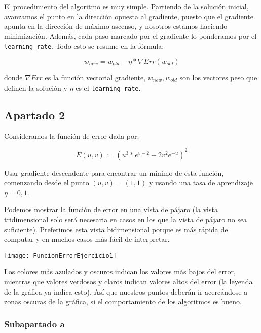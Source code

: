 \documentclass[11pt]{article}
\begin{document}
El procedimiento del algoritmo es muy simple. Partiendo de la solución inicial, avanzamos el punto en la dirección opuesta al gradiente, puesto que el gradiente apunta en la dirección de máximo ascenso, y nosotros estamos haciendo minimización. Además, cada paso marcado por el gradiente lo ponderamos por el \lstinline{learning_rate}. Todo esto se resume en la fórmula:

\begin{displaymath}
    w_{new} = w_{old} - \eta * \nabla Err(w_{old})
\end{displaymath}

donde $\nabla Err$ es la función vectorial gradiente, $w_{new}, w_{old}$ son los vectores peso que definen la solución y $\eta$ es el \lstinline{learning_rate}.

\pagebreak

\subsection{Apartado 2}
\label{seccion:Apartado2}

Consideramos la función de error dada por:

\begin{displaymath}
    E(u, v) := (u^3 * e^{v-2} - 2v^2 e^{-u})^2
\end{displaymath}

Usar gradiente descendente para encontrar un mínimo de esta función, comenzando desde el punto $(u, v) = (1, 1)$ y
usando una tasa de aprendizaje $\eta = 0,1$.

Podemos mostrar la función de error en una vista de pájaro (la vista tridimensional solo será necesaria en casos en los que la vista de pájaro no sea suficiente). Preferimos esta vista bidimensional porque es más rápida de computar y en muchos casos más fácil de interpretar.

\texttt{[image: FuncionErrorEjercicio1]}

Los colores más azulados y oscuros indican los valores más bajos del error, mientras que valores verdosos y claros indican valores altos del error (la leyenda de la gráfica ya indica esto). Así que nuestros puntos deberán ir acercándose a zonas oscuras de la gráfica, si el comportamiento de los algoritmos es bueno.


\subsubsection{Subapartado a}
\end{document}
